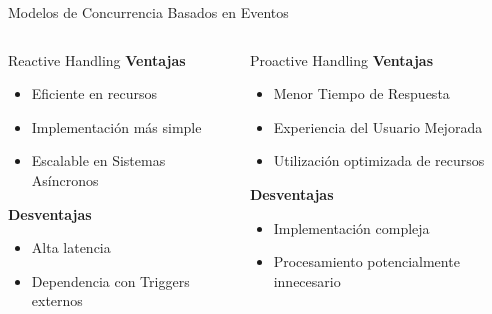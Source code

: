 \documentclass[11pt]{beamer}
\begin{document}
	\begin{frame}{Modelos de Concurrencia Basados en Eventos}
		\small
		
		\begin{columns}[T]
			
			\begin{block}{Reactive Handling}
				\textbf{Ventajas}
				\begin{itemize}
					\item Eficiente en recursos
					\item Implementación más simple
					\item Escalable en Sistemas Asíncronos
				\end{itemize}
				
				\vspace{0.2cm}
				\textbf{Desventajas}
				\begin{itemize}
					\item Alta latencia
					\item Dependencia con Triggers externos
				\end{itemize}
			\end{block}
			
			
			\begin{block}{Proactive Handling}
				\textbf{Ventajas}
				\begin{itemize}
					\item Menor Tiempo de Respuesta
					\item Experiencia del Usuario Mejorada
					\item Utilización optimizada de recursos
				\end{itemize}
				
				\vspace{0.2cm}
				\textbf{Desventajas}
				\begin{itemize}
					\item Implementación compleja
					\item Procesamiento potencialmente innecesario
				\end{itemize}
			\end{block}
			
		\end{columns}
	\end{frame}
	
\end{document}
